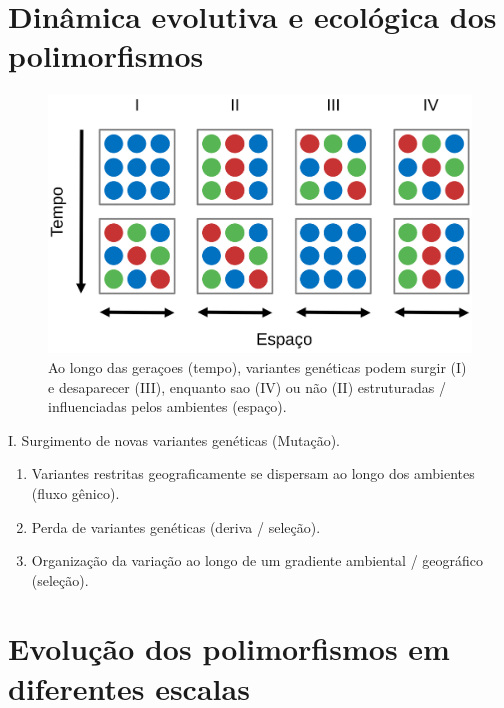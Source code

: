 \documentclass[
]{book}
\begin{document}
\hypertarget{dinuxe2mica-evolutiva-e-ecoluxf3gica-dos-polimorfismos}{%
\section{Dinâmica evolutiva e ecológica dos polimorfismos}\label{dinuxe2mica-evolutiva-e-ecoluxf3gica-dos-polimorfismos}}

\begin{figure}

{\centering \includegraphics[width=600px]{figs/dinamicas_evolutivas_tempo} 

}

\caption{Ao longo das geraçoes (tempo), variantes genéticas podem surgir (I) e desaparecer (III), enquanto sao (IV) ou não (II) estruturadas / influenciadas pelos ambientes (espaço).}\label{fig:evodinamica}
\end{figure}

I. Surgimento de novas variantes genéticas (Mutação).

\begin{enumerate}
\def\labelenumi{\Roman{enumi}.}
\setcounter{enumi}{1}
\item
  Variantes restritas geograficamente se dispersam ao longo dos ambientes (fluxo gênico).
\item
  Perda de variantes genéticas (deriva / seleção).
\item
  Organização da variação ao longo de um gradiente ambiental / geográfico (seleção).
\end{enumerate}

\hypertarget{evoluuxe7uxe3o-dos-polimorfismos-em-diferentes-escalas}{%
\section{Evolução dos polimorfismos em diferentes escalas}\label{evoluuxe7uxe3o-dos-polimorfismos-em-diferentes-escalas}}
\end{document}
